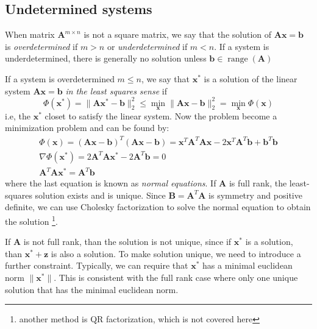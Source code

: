 \documentclass{article}
\DeclareMathOperator{\range}{range}
\begin{document}
\subsection{Undetermined systems}
When matrix $\mathbf{A}^{m\times n}$ is not a square matrix, we say that 
the solution of $\mathbf{A}\mathbf{x} = \mathbf{b}$ is \emph{overdetermined} if $m>n$ 
or \emph{underdetermined} if $m < n$. 
If a system is underdetermined, there is generally no solution unless 
$\mathbf{b}\in \range(\mathbf{A})$

If a system is overdetermined $m \leq n$, we say that $\mathbf{x}^*$ is a solution
of the linear system $\mathbf{A}\mathbf{x} = \mathbf{b}$ \emph{in the least squares sense}
if 
\begin{equation}
    \Phi(\mathbf{x}^*) = \|\mathbf{A}\mathbf{x}^* - \mathbf{b}\|_2^2 
    \leq \min_{\mathbf{x}} \|\mathbf{A}\mathbf{x} - \mathbf{b}\|_2^2 
    = \min_{\mathbf{x}} \Phi(\mathbf{x})
\end{equation}
i.e, the $\mathbf{x}^*$ closet to satisfy the linear system. Now the problem 
become a minimization problem and can be found by:
\begin{gather*}
    \Phi(\mathbf{x}) 
    = (\mathbf{A}\mathbf{x} - \mathbf{b})^T (\mathbf{A}\mathbf{x} - \mathbf{b})
    = \mathbf{x}^T \mathbf{A}^T \mathbf{A} \mathbf{x} - 2 \mathbf{x}^T \mathbf{A}^T \mathbf{b} 
      +  \mathbf{b}^T \mathbf{b} \\
    \nabla \Phi(\mathbf{x}^*) 
    = 2 \mathbf{A}^T \mathbf{A} \mathbf{x}^* - 2 \mathbf{A}^T \mathbf{b} = 0 \\
    \mathbf{A}^T \mathbf{A} \mathbf{x}^* = \mathbf{A}^T \mathbf{b}
\end{gather*}
where the last equation is known as \emph{normal equations}. If $\mathbf{A}$ is full rank, the 
least-squares solution exists and is unique. 
Since $\mathbf{B} = \mathbf{A}^T \mathbf{A}$ is symmetry and positive definite, we can use 
Cholesky factorization to solve the normal equation to obtain the solution
\footnote{another method is QR factorization, which is not covered here}.

If $\mathbf{A}$ is not full rank, than the solution is not unique, since if $\mathbf{x}^*$ 
is a solution, than $\mathbf{x}^* + \mathbf{z}$ is also a solution. To make solution unique,
we need to introduce a further constraint. Typically, we can require that $\mathbf{x}^*$
has a minimal euclidean norm $\|\mathbf{x}^*\|$.
This is consistent with the full rank case where only one unique solution that has the 
minimal euclidean norm. 
\end{document}
